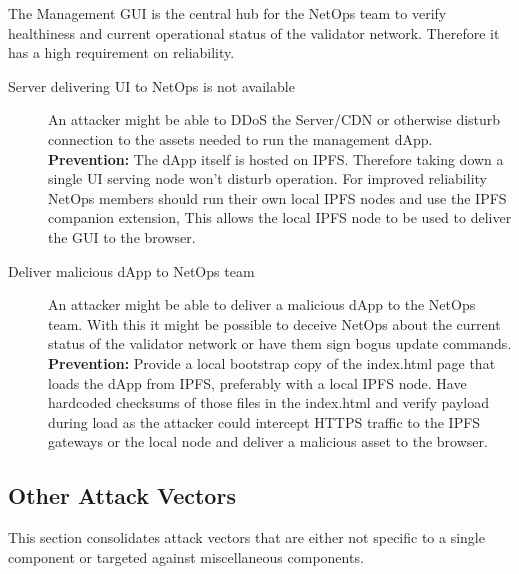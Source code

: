 The Management GUI is the central hub for the NetOps team to verify healthiness and current operational status of the validator network. Therefore it has a high requirement on reliability.

\begin{description}

    \item[Server delivering UI to NetOps is not available] 
        An attacker might be able to DDoS the Server/CDN or otherwise disturb connection to the assets needed to run the management dApp. \\
        \textbf{Prevention:} The dApp itself is hosted on IPFS. Therefore taking down a single UI serving node won't disturb operation. For improved reliability NetOps members should run their own local IPFS nodes and use the IPFS companion extension,
        This allows the local IPFS node to be used to deliver the GUI to the browser. 

    \item[Deliver malicious dApp to NetOps team] 
        An attacker might be able to deliver a malicious dApp to the NetOps team. With this it might be possible to deceive NetOps about the current status of the validator network or have them sign bogus update commands.  \\
        \textbf{Prevention:} Provide a local bootstrap copy of the index.html page that loads the dApp from IPFS, preferably with a local IPFS node. Have hardcoded checksums of those files in the index.html and verify payload during load as the attacker could intercept HTTPS traffic to the IPFS gateways or the local node and deliver a malicious asset to the browser.

\end{description}


\subsection{Other Attack Vectors}

This section consolidates attack vectors that are either not specific to a single component or targeted against miscellaneous components.


